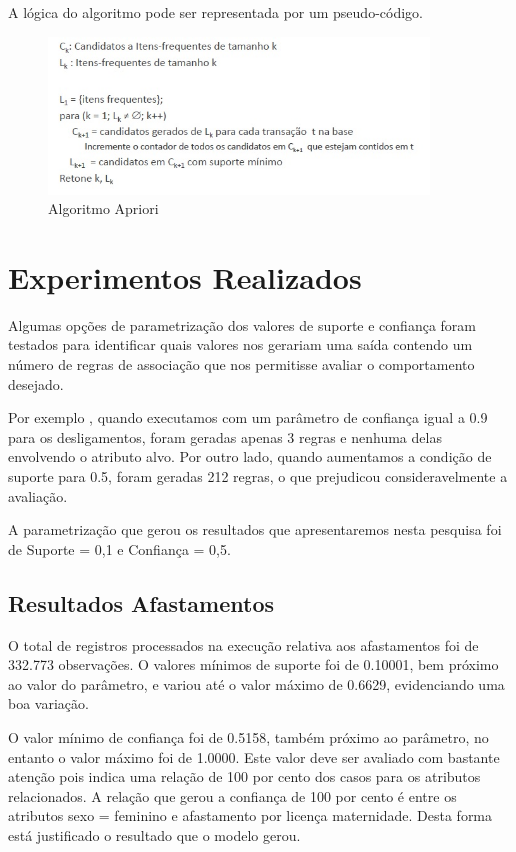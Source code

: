 \documentclass[12pt]{article}
\begin{document}
A lógica do algoritmo pode ser representada por um pseudo-código.
\FloatBarrier
\begin{figure}[!htb]
\centering
\includegraphics[width=0.9\textwidth]{PseudoCodigoApriori.jpg}
\caption{Algoritmo Apriori}
\label{fig:exampleFig12}
\end{figure}


\section{Experimentos Realizados}

Algumas opções de parametrização dos valores de suporte e confiança foram testados para identificar quais valores nos gerariam uma saída contendo um número de regras de associação que nos permitisse avaliar o comportamento desejado.

Por exemplo , quando executamos com um parâmetro de confiança igual a 0.9 para os desligamentos, foram geradas apenas 3 regras e nenhuma delas envolvendo o atributo alvo. Por outro lado, quando aumentamos a condição de suporte para 0.5, foram geradas 212 regras, o que prejudicou consideravelmente a avaliação.

A parametrização que gerou os resultados que apresentaremos nesta pesquisa foi de  Suporte = 0,1 e Confiança = 0,5.

\subsection{Resultados Afastamentos}

O total de registros processados na execução relativa aos afastamentos foi de 332.773 observações.
O valores mínimos de suporte foi de 0.10001, bem próximo ao valor do parâmetro, e variou até o valor máximo de 0.6629, evidenciando uma boa variação.

O valor mínimo de confiança foi de 0.5158, também próximo ao parâmetro, no entanto o valor máximo foi de 1.0000. Este valor deve ser avaliado com bastante atenção pois indica uma relação de 100 por cento dos casos para os atributos relacionados.
A relação que gerou a confiança de 100 por cento é entre os atributos sexo = feminino e afastamento por licença maternidade. Desta forma está justificado o resultado que o modelo gerou.
\end{document}
